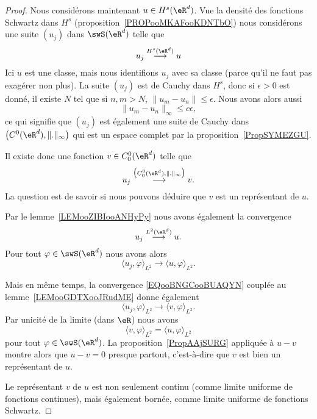 \begin{proof}
	Nous considérons maintenant \( u\in H^s(\eR^d)\). Vue la densité des fonctions Schwartz dans \( H^s\) (proposition~\ref{PROPooMKAFooKDNTbO}) nous considérons une suite \( (u_j)\) dans \( \swS(\eR^d)\) telle que
	\begin{equation}
		u_j\stackrel{H^s(\eR^d)}{\longrightarrow}u
	\end{equation}
	Ici \( u\) est une classe, mais nous identifions \( u_j\) avec sa classe (parce qu'il ne faut pas exagérer non plus). La suite \( (u_j)\) est de Cauchy dans \( H^s\), donc si \( \epsilon>0\) est donné, il existe \( N\) tel que si \( n,m>N\), \( \| u_m-u_n \|\leq \epsilon\). Nous avons alors aussi
	\begin{equation}
		\| u_m-u_n \|_{\infty}\leq c\epsilon,
	\end{equation}
	ce qui signifie que \( (u_j)\) est également une suite de Cauchy dans \( \big( C^0(\eR^d),\| . \|_{\infty} \big)\) qui est un espace complet par la proposition~\ref{PropSYMEZGU}.

	Il existe donc une fonction \( v\in C_0^0(\eR^d)\) telle que
	\begin{equation}        \label{EQooBNGCooBUAQYN}
		u_j\stackrel{\big( C^0_0(\eR^d), \| . \|_{\infty} \big)}{\longrightarrow}v.
	\end{equation}
	La question est de savoir si nous pouvons déduire que \( v\) est un représentant de \( u\).

	Par le lemme~\ref{LEMooZIBIooANHyPy} nous avons également la convergence
	\begin{equation}
		u_j\stackrel{L^2(\eR^d)}{\longrightarrow} u.
	\end{equation}
	Pour tout \( \varphi\in \swS(\eR^d)\) nous avons alors
	\begin{equation}
		\langle u_j, \varphi\rangle_{L^2}\to\langle u, \varphi\rangle_{L^2}.
	\end{equation}

	Mais en même temps, la convergence \eqref{EQooBNGCooBUAQYN} couplée au lemme~\ref{LEMooGDTXooJRudME} donne également
	\begin{equation}
		\langle u_j, \varphi\rangle_{L^2}\to \langle v, \varphi\rangle_{L^2}.
	\end{equation}
	Par unicité de la limite (dans \( \eR\)) nous avons
	\begin{equation}
		\langle v, \varphi\rangle_{L^2}=\langle u, \varphi\rangle_{L^2}
	\end{equation}
	pour tout \( \varphi\in\swS(\eR^d)\). La proposition~\ref{PropAAjSURG} appliquée à \( u-v\) montre alors que \( u-v=0\) presque partout, c'est-à-dire que \( v\) est bien un représentant de \( u\).

	Le représentant \( v\) de \( u\) est non seulement continu (comme limite uniforme de fonctions continues), mais également bornée, comme limite uniforme de fonctions Schwartz.
\end{proof}

